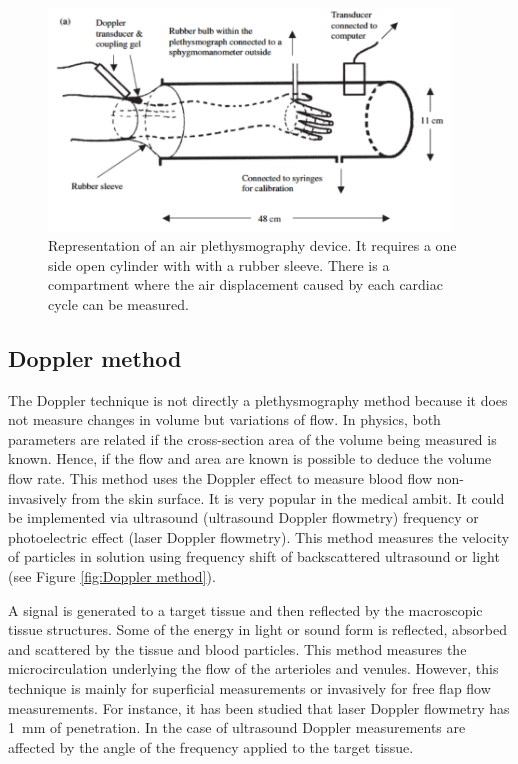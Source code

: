 \begin{figure}[!htpb]
	\centering
	\includegraphics[width=0.95\textwidth,keepaspectratio]{figure2}    
	\caption[Air plethysmography method]{Representation of an air plethysmography device. It requires a one side open cylinder with with a rubber sleeve. There is a compartment where the air displacement caused by each cardiac cycle can be measured.}
	\label{fig:air plethysmography}
\end{figure}

\subsection{Doppler method}
\label{section literature 3.2}
The Doppler technique is not directly a plethysmography method because it does not measure changes in volume but variations of flow. In physics, both parameters are related if the cross-section area of the volume being measured is known. Hence, if the flow and area are known is possible to deduce the volume flow rate. This method uses the Doppler effect to measure blood flow non-invasively from the skin surface. It is very popular in the medical ambit. It could be implemented via ultrasound (ultrasound Doppler flowmetry) frequency or photoelectric effect (laser Doppler flowmetry).  This method measures the velocity of particles in solution using frequency shift of backscattered ultrasound or light~\cite{orekhova2013doppler} (see Figure \ref{fig:Doppler method}). 

A signal is generated to a target tissue and then reflected by the macroscopic tissue structures. Some of the energy in light or sound form is reflected, absorbed and scattered by the tissue and blood particles. This method measures the microcirculation underlying the flow of the arterioles and venules. However, this technique is mainly for superficial measurements or invasively for free flap flow measurements. For instance, it has been studied that laser Doppler flowmetry has \SI{1}{\milli\meter} of penetration. In the case of ultrasound Doppler measurements are affected by the angle of the frequency applied to the target tissue.

